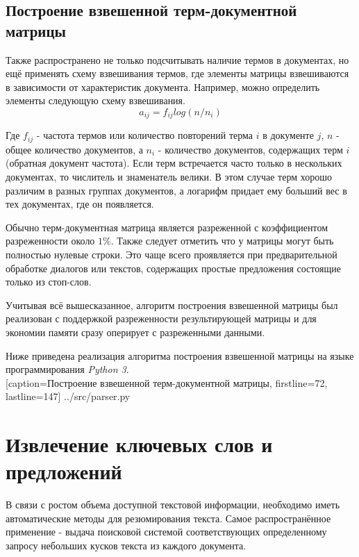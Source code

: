 \subsection{Построение взвешенной терм-документной матрицы}

Также распространено не только подсчитывать наличие термов в документах,
но ещё применять схему взвешивания термов, где элементы матрицы взвешиваются в зависимости от характеристик документа.
Например, можно определить элементы следующую схему взвешивания.
\begin{equation}
  a_{ij} = f_{ij} log(n /n_i)
\end{equation}

Где $f_{ij}$ - частота термов или количество повторений терма $i$ в документе $j$, $n$ - общее количество документов,  а $n_i$ - количество документов, содержащих терм $i$ (обратная документ частота).
Если терм встречается часто только в нескольких документах, то числитель и знаменатель велики.
В этом случае терм хорошо различим в разных группах документов, а логарифм придает ему больший вес в тех документах, где он появляется.

Обычно терм-документная матрица является разреженной с коэффициентом разреженности около $1\%$.
Также следует отметить что у матрицы могут быть полностью нулевые строки.
Это чаще всего проявляется при предварительной обработке диалогов или текстов,
содержащих простые предложения состоящие только из стоп-слов.

Учитывая всё вышесказанное, алгоритм построения взвешенной матрицы
был реализован с поддержкой разреженности результирующей матрицы
и для экономии памяти сразу оперирует с разреженными данными.

\newpage

Ниже приведена реализация алгоритма построения взвешенной матрицы на языке программирования \textit{Python 3}.
\\


  [caption=Построение взвешенной терм-документной матрицы, firstline=72, lastline=147]
  {../src/parser.py}




\newpage




\section{Извлечение ключевых слов и предложений}

В связи с ростом объема доступной текстовой информации, необходимо иметь автоматические методы для резюмирования текста.
Самое распространённое применение - выдача поисковой системой соответствующих определенному запросу небольших кусков текста из каждого документа.

